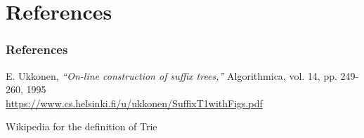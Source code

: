\documentclass[compress,usenames,dvipsnames]{beamer}
\begin{document}
\section{References}
\begin{frame}\frametitle{References}
    \begin{thebibliography}{9}
        E. Ukkonen,
        \textit{``On-line construction of suffix trees,''}
        Algorithmica, vol. 14, pp. 249-260, 1995 \\
        \url{https://www.cs.helsinki.fi/u/ukkonen/SuffixT1withFigs.pdf} 
    \end{thebibliography}
    \hfill \break
    Wikipedia for the definition of Trie
\end{frame}
\end{document}
